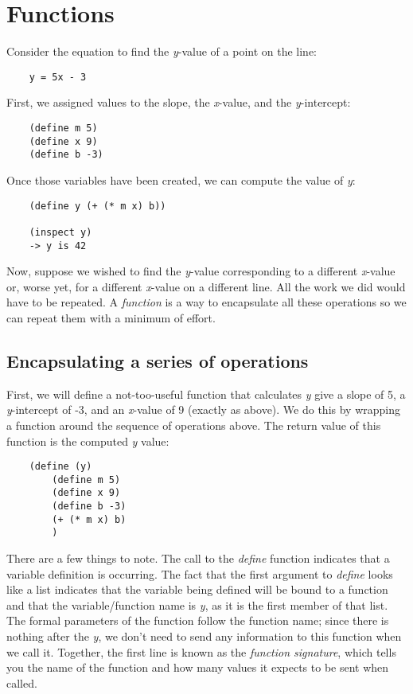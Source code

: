 \chapter{Functions}
\label{Functions}

Consider the equation to find
the {\it y}-value of a point on the line:

\begin{verbatim}
    y = 5x - 3
\end{verbatim}
    
First, we assigned values to the slope,
the {\it x}-value, and the {\it y}-intercept:

\begin{verbatim}
    (define m 5)
    (define x 9)
    (define b -3)
\end{verbatim}

Once those variables have been created,
we can compute the value of {\it y}:

\begin{verbatim}
    (define y (+ (* m x) b))

    (inspect y)
    -> y is 42
\end{verbatim}

Now, suppose we wished to find the {\it y}-value corresponding to
a different {\it x}-value or, worse yet, for a different {\it x}-value
on a different line. All the work we did would have to be
repeated. A {\it function} is a way to encapsulate all these operations
so we can repeat them with a minimum of effort.

\section{Encapsulating a series of operations}

First, we will define a not-too-useful function that
calculates {\it y} give a slope of 5,
a {\it y}-intercept of -3, and an
{\it x}-value of 9 (exactly
as above). We do this by wrapping a function around
the sequence of operations above.
The return value of this function is the computed {\it y} value:

\begin{verbatim}
    (define (y)
        (define m 5)
        (define x 9)
        (define b -3)
        (+ (* m x) b)
        )
\end{verbatim}

There are a few things to note. The call to the {\it define}
function indicates
that a variable definition is occurring. The fact that the first
argument to {\it define} looks like a list indicates that the variable
being defined will be bound to a function and that the variable/function
name is {\it y}, as it is the first member of that list.
The formal parameters of the function follow the function name;
since there is nothing after the {\it y}, we don't
need to send any information to this function when we call it.
Together, the first line is known as the {\it function signature},
which tells you the name of the function and how many values
it expects to be sent when called.

